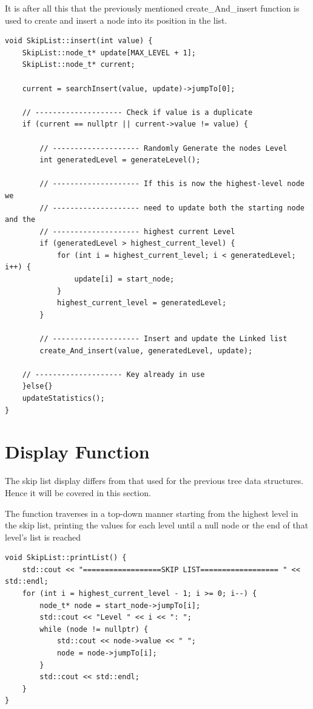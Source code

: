 \documentclass[12pt, a4paper]{report}
\begin{document}
It is after all this that the previously mentioned create\_And\_insert function is used to create and insert a node into its position in the list.
\begin{verbatim}
void SkipList::insert(int value) {
    SkipList::node_t* update[MAX_LEVEL + 1];
    SkipList::node_t* current;

    current = searchInsert(value, update)->jumpTo[0];

    // -------------------- Check if value is a duplicate
    if (current == nullptr || current->value != value) {

        // -------------------- Randomly Generate the nodes Level
        int generatedLevel = generateLevel();
        
        // -------------------- If this is now the highest-level node we
        // -------------------- need to update both the starting node and the
        // -------------------- highest current Level
        if (generatedLevel > highest_current_level) {
            for (int i = highest_current_level; i < generatedLevel; i++) {
                update[i] = start_node;
            }
            highest_current_level = generatedLevel;
        }

        // -------------------- Insert and update the Linked list
        create_And_insert(value, generatedLevel, update);
    
    // -------------------- Key already in use
    }else{}
    updateStatistics();
}
\end{verbatim}


\section{Display Function}
The skip list display differs from that used for the previous tree data structures. Hence it will be covered in this section.

The function traverses in a top-down manner starting from the highest level in the skip list, printing the values for each level until a null node or the end of that level's list is reached

\begin{verbatim}
void SkipList::printList() {
    std::cout << "==================SKIP LIST================== " << std::endl;
    for (int i = highest_current_level - 1; i >= 0; i--) {
        node_t* node = start_node->jumpTo[i];
        std::cout << "Level " << i << ": ";
        while (node != nullptr) {
            std::cout << node->value << " ";
            node = node->jumpTo[i];
        }
        std::cout << std::endl;
    }
}
\end{verbatim}
\end{document}
